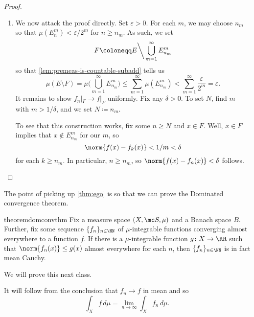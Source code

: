 \documentclass[../notes.tex]{subfiles}
\begin{document}
\begin{proof}
\begin{enumerate}
		\item We now attack the proof directly. Set $\varepsilon>0$. For each $m$, we may choose $n_m$ so that $\mu\left(E^m_{n}\right)<\varepsilon/2^m$ for $n\ge n_m$. As such, we set
		\[F\coloneqq E{\mathbin\bigg\backslash}\bigcup_{m=1}^\infty E^m_{n_m}\]
		so that \autoref{lem:premeas-is-countable-subadd} tells us
		\[\mu(E\setminus F)=\mu\Bigg(\bigcup_{m=1}^\infty E^m_{n_m}\Bigg)\le\sum_{m=1}^\infty\mu\left(E^m_{n_m}\right)<\sum_{m=1}^\infty\frac\varepsilon{2^m}=\varepsilon.\]
		It remains to show $f_n|_F\to f|_F$ uniformly. Fix any $\delta>0$. To set $N$, find $m$ with $m>1/\delta$, and we set $N\coloneqq n_{m}$.
		
		To see that this construction works, fix some $n\ge N$ and $x\in F$. Well, $x\in F$ implies that $x\notin E^m_{n_m}$ for our $m$, so
		\[\norm{f(x)-f_k(x)}<1/m<\delta\]
		for each $k\ge n_m$. In particular, $n\ge n_m$, so $\norm{f(x)-f_n(x)}<\delta$ follows.
		\qedhere
	\end{enumerate}
\end{proof}
The point of picking up \autoref{thm:ego} is so that we can prove the Dominated convergence theorem.
\begin{restatable}{theorem}{domconvthm} \label{thm:dom-conv}
	Fix a measure space $(X,\mc S,\mu)$ and a Banach space $B$. Further, fix some sequence $\{f_n\}_{n\in\NN}$ of $\mu$-integrable functions converging almost everywhere to a function $f$. If there is a $\mu$-integrable function $g\colon X\to\RR$ such that $\norm{f_n(x)}\le g(x)$ almost everywhere for each $n$, then $\{f_n\}_{n\in\NN}$ is in fact mean Cauchy.
\end{restatable}
\noindent We will prove this next class.
\begin{remark}
	It will follow from the conclusion that $f_n\to f$ in mean and so
	\[\int_Xf\,d\mu=\lim_{n\to\infty}\int_Xf_n\,d\mu.\]
\end{remark}
\end{document}
